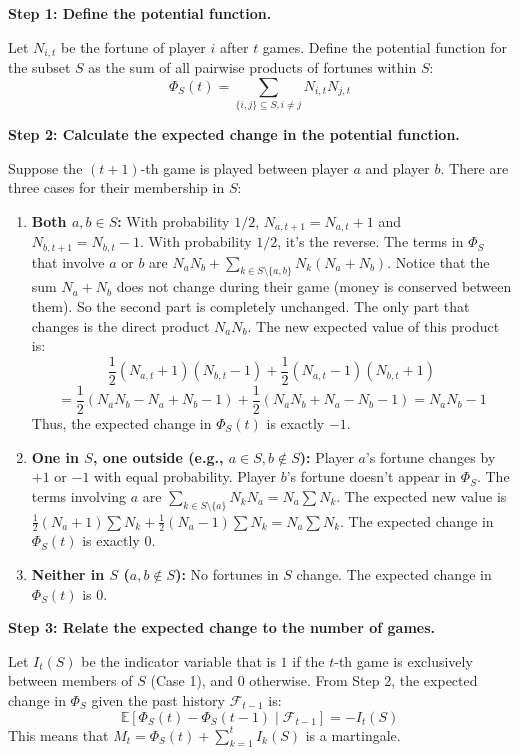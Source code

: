 \begin{solution}
\textbf{Step 1: Define the potential function.}

Let $N_{i,t}$ be the fortune of player $i$ after $t$ games.
Define the potential function for the subset $S$ as the sum of all pairwise products of fortunes within $S$:
\[ \Phi_S(t) = \sum_{\{i,j\} \subseteq S, i \neq j} N_{i,t} N_{j,t} \]

\textbf{Step 2: Calculate the expected change in the potential function.}

Suppose the $(t+1)$-th game is played between player $a$ and player $b$. There are three cases for their membership in $S$:
\begin{enumerate}
    \item \textbf{Both $a, b \in S$:} With probability $1/2$, $N_{a,t+1} = N_{a,t}+1$ and $N_{b,t+1} = N_{b,t}-1$. With probability $1/2$, it's the reverse.
    The terms in $\Phi_S$ that involve $a$ or $b$ are $N_{a}N_{b} + \sum_{k \in S \setminus \{a,b\}} N_{k}(N_{a} + N_{b})$.
    Notice that the sum $N_a + N_b$ does not change during their game (money is conserved between them). So the second part is completely unchanged.
    The only part that changes is the direct product $N_a N_b$.
    The new expected value of this product is:
    \[ \frac{1}{2}(N_{a,t}+1)(N_{b,t}-1) + \frac{1}{2}(N_{a,t}-1)(N_{b,t}+1) \]
    \[ = \frac{1}{2}(N_a N_b - N_a + N_b - 1) + \frac{1}{2}(N_a N_b + N_a - N_b - 1) = N_a N_b - 1 \]
    Thus, the expected change in $\Phi_S(t)$ is exactly $-1$.

    \item \textbf{One in $S$, one outside (e.g., $a \in S, b \notin S$):} Player $a$'s fortune changes by $+1$ or $-1$ with equal probability. Player $b$'s fortune doesn't appear in $\Phi_S$.
    The terms involving $a$ are $\sum_{k \in S \setminus \{a\}} N_k N_a = N_a \sum N_k$.
    The expected new value is $\frac{1}{2}(N_a+1)\sum N_k + \frac{1}{2}(N_a-1)\sum N_k = N_a \sum N_k$.
    The expected change in $\Phi_S(t)$ is exactly $0$.

    \item \textbf{Neither in $S$ ($a, b \notin S$):} No fortunes in $S$ change. The expected change in $\Phi_S(t)$ is $0$.
\end{enumerate}

\textbf{Step 3: Relate the expected change to the number of games.}

Let $I_{t}(S)$ be the indicator variable that is $1$ if the $t$-th game is exclusively between members of $S$ (Case 1), and $0$ otherwise.
From Step 2, the expected change in $\Phi_S$ given the past history $\mathcal{F}_{t-1}$ is:
\[ \mathbb{E}[\Phi_S(t) - \Phi_S(t-1) \mid \mathcal{F}_{t-1}] = -I_t(S) \]
This means that $M_t = \Phi_S(t) + \sum_{k=1}^t I_k(S)$ is a martingale.


\end{solution}
